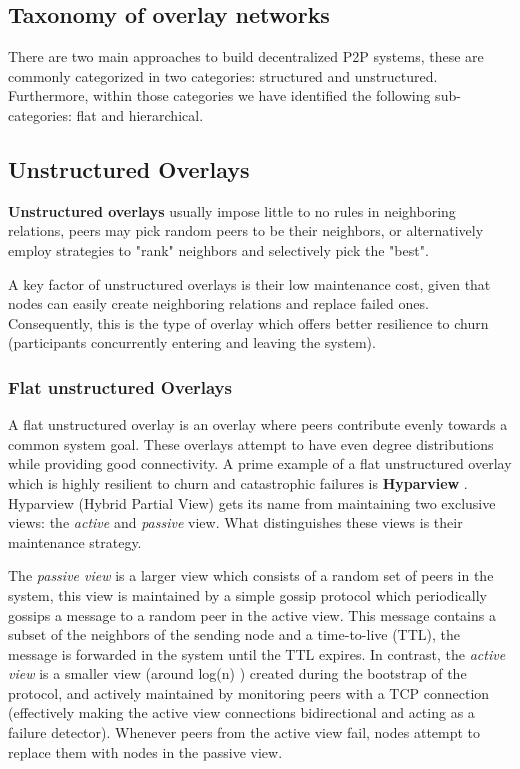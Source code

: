 \subsection{Taxonomy of overlay networks}

There are two main approaches to build decentralized P2P systems, these are commonly categorized in two categories: structured and unstructured. Furthermore, within those categories we have identified the following sub-categories: flat and hierarchical. 

\subsection{Unstructured Overlays}

\textbf{Unstructured overlays} usually impose little to no rules in neighboring relations, peers may pick random peers to be their neighbors, or alternatively employ strategies to "rank" neighbors and selectively pick the "best".

A key factor of unstructured overlays is their low maintenance cost, given that nodes can easily create neighboring relations and replace failed ones. Consequently, this is the type of overlay which offers better resilience to churn \cite{stutzbach2006understanding} (participants concurrently entering and leaving the system).

\subsubsection{Flat unstructured Overlays}

A flat unstructured overlay is an overlay where peers contribute evenly towards a common system goal. These overlays attempt to have even degree distributions while providing good connectivity. A prime example of a flat unstructured overlay which is highly resilient to churn and catastrophic failures is \textbf{Hyparview} \cite{Hyparview}. Hyparview (Hybrid Partial View) gets its name from maintaining two exclusive views: the \textit{active} and \textit{passive} view. What distinguishes these views is their maintenance strategy. 

The \textit{passive view} is a larger view which consists of a random set of peers in the system, this view is maintained by a simple gossip protocol which periodically gossips a message to a random peer in the active view. This message contains a subset of the neighbors of the sending node and a time-to-live (TTL), the message is forwarded in the system until the TTL expires. In contrast, the \textit{active view} is a smaller view (around log(n) ) created during the bootstrap of the protocol, and actively maintained by monitoring peers with a TCP connection (effectively making the active view connections bidirectional and acting as a failure detector). Whenever peers from the active view fail, nodes attempt to replace them with nodes in the passive view.


